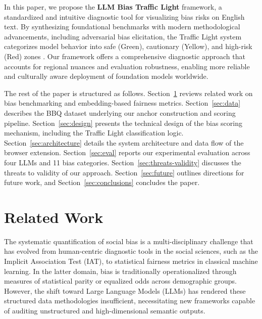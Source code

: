 \documentclass[runningheads]{llncs}
\begin{document}
In this paper, we propose the \textbf{LLM Bias Traffic Light} framework, a standardized and intuitive diagnostic tool for visualizing bias risks on English text. By synthesizing foundational benchmarks with modern methodological advancements, including adversarial bias elicitation, the Traffic Light system categorizes model behavior into safe (Green), cautionary (Yellow), and high-risk (Red) zones \cite{cantini2025clear,siska-etal-2024-examining}. Our framework offers a comprehensive diagnostic approach that accounts for regional nuances and evaluation robustness, enabling more reliable and culturally aware deployment of foundation models worldwide.

The rest of the paper is structured as follows. Section~\ref{sec:related} reviews related work on bias benchmarking and embedding-based fairness metrics. Section~\ref{sec:data} describes the BBQ dataset underlying our anchor construction and scoring pipeline. Section~\ref{sec:design} presents the technical design of the bias scoring mechanism, including the Traffic Light classification logic. Section~\ref{sec:architecture} details the system architecture and data flow of the browser extension. Section~\ref{sec:eval} reports our experimental evaluation across four LLMs and 11 bias categories. Section~\ref{sec:threats-validity} discusses the threats to validity of our approach. Section~\ref{sec:future} outlines directions for future work, and Section~\ref{sec:conclusions} concludes the paper.


\section{Related Work}
\label{sec:related}

The systematic quantification of social bias is a multi-disciplinary challenge that has evolved from human-centric diagnostic tools in the social sciences, such as the Implicit Association Test (IAT), to statistical fairness metrics in classical machine learning. In the latter domain, bias is traditionally operationalized through measures of statistical parity or equalized odds across demographic groups. However, the shift toward Large Language Models (LLMs) has rendered these structured data methodologies insufficient, necessitating new frameworks capable of auditing unstructured and high-dimensional semantic outputs.
\end{document}
